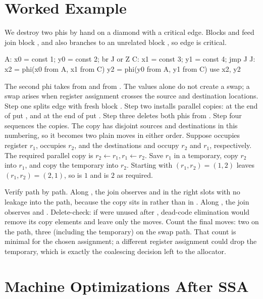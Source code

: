 \section{Worked Example}\label{sec:ch28-worked}

We destroy two phis by hand on a diamond with a critical edge.
Blocks  and  feed join block , and  also branches to an unrelated block , so edge  is critical.
\begin{irlisting}
A: x0 = const 1; y0 = const 2; br J or Z
C: x1 = const 3; y1 = const 4; jmp J
J: x2 = phi(x0 from A, x1 from C)
   y2 = phi(y0 from A, y1 from C)
   use x2, y2
\end{irlisting}
The second phi takes  from  and  from .
The values alone do not create a swap; a swap arises when register assignment crosses the source and destination locations.
Step one splits edge  with fresh block .
Step two installs parallel copies: at the end of  put , and at the end of  put .
Step three deletes both phis from .
Step four sequences the copies.
The  copy has disjoint sources and destinations in this numbering, so it becomes two plain moves in either order.
Suppose  occupies register $r_1$,  occupies $r_2$, and the destinations  and  occupy $r_2$ and $r_1$, respectively.
The required parallel copy is $r_2\gets r_1, r_1\gets r_2$.
Save $r_1$ in a temporary, copy $r_2$ into $r_1$, and copy the temporary into $r_2$.
Starting with $(r_1,r_2)=(1,2)$ leaves $(r_1,r_2)=(2,1)$, so  is $1$ and  is $2$ as required.

Verify path by path.
Along , the join observes  and  in the right slots with no leakage into the  path, because the copy sits in  rather than in .
Along , the join observes  and .
Delete-check: if  were unused after , dead-code elimination would remove its copy elements and leave only the  moves.
Count the final moves: two on the  path, three (including the temporary) on the swap path.
That count is minimal for the chosen assignment; a different register assignment could drop the temporary, which is exactly the coalescing decision left to the allocator.

\section{Machine Optimizations After SSA}\label{sec:ch28-machine-opt}

